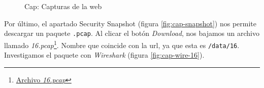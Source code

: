 \begin{figure}
    \centering
    \qquad
    \qquad
    \caption{Cap: Capturas de la web}
    \label{fig:cap}
\end{figure}

Por último, el apartado Security Snapshot (figura \ref{fig:cap-snapshot}) nos permite descargar un paquete \texttt{.pcap}. Al clicar el botón \textit{Download}, nos bajamos un archivo llamado \textit{16.pcap}\footnote{\href{https://github.com/VictorNS69/TFM/blob/main/machines/cap/pcaps/16.pcap}{Archivo \textit{16.pcap}}}. Nombre que coincide con la \acrshort{url}, ya que esta es \texttt{/data/16}. Investigamos el paquete con \textit{Wireshark}\cite{wireshark} (figura \ref{fig:cap-wire-16}).\\

